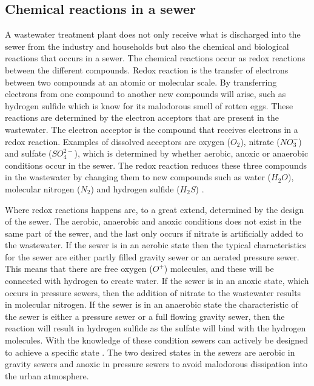 \subsection{Chemical reactions in a sewer}\label{subse:chemical_reactions_in_a_sewer}
A wastewater treatment plant does not only receive what is discharged into the sewer from the industry and households but also the chemical and biological reactions that occurs in a sewer. The chemical reactions occur as redox reactions between the different compounds. Redox reaction is the transfer of electrons between two compounds at an atomic or molecular scale. By transferring electrons from one compound to another new compounds will arise, such as hydrogen sulfide which is know for its malodorous smell of rotten eggs. These reactions are determined by the electron acceptors that are present in the wastewater. The electron acceptor is the compound that receives electrons in a redox reaction. Examples of dissolved acceptors are oxygen ($O_2$), nitrate ($NO^-_3$) and sulfate ($SO^{2-}_4$), which is determined by whether aerobic, anoxic or anaerobic conditions occur in the sewer. The redox reaction reduces these three compounds in the wastewater by changing them to new compounds such as water ($H_2O$), molecular nitrogen ($N_2$) and hydrogen sulfide ($H_2S$) \cite{Sewer_processes}. 

Where redox reactions happens are, to a great extend, determined by the design of the sewer. The aerobic, anaerobic and anoxic conditions does not exist in the same part of the sewer, and the last only occurs if nitrate is artificially added to the wastewater. If the sewer is in an aerobic state then the typical characteristics for the sewer are either partly filled gravity sewer or an aerated pressure sewer. This means that there are free oxygen ($O^+$) molecules, and these will be connected with hydrogen to create water. If the sewer is in an anoxic state, which occurs in pressure sewers, then the addition of nitrate to the wastewater results in molecular nitrogen. If the sewer is in an anaerobic state the characteristic of the sewer is either a pressure sewer or a full flowing gravity sewer, then the reaction will result in hydrogen sulfide as the sulfate will bind with the hydrogen molecules. With the knowledge of these condition sewers can actively be designed to achieve a specific state \cite{Sewer_processes}. The two desired states in the sewers are aerobic in gravity sewers and anoxic in pressure sewers to avoid malodorous dissipation into the urban atmosphere.

